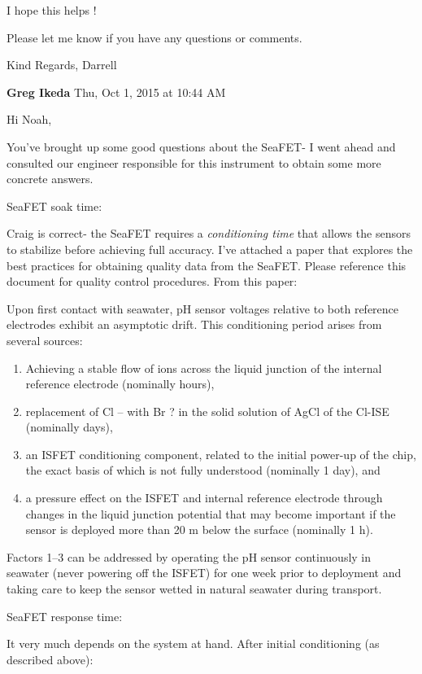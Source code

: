\documentclass[
]{book}
\begin{document}
I hope this helps !

Please let me know if you have any questions or comments.

Kind Regards,
Darrell

\textbf{Greg Ikeda} Thu, Oct 1, 2015 at 10:44 AM

Hi Noah,

You've brought up some good questions about the SeaFET- I went ahead and consulted our engineer responsible for this instrument to obtain some more concrete answers.

SeaFET soak time:

Craig is correct- the SeaFET requires a \emph{conditioning time} that allows the sensors to stabilize before achieving full accuracy. I've attached a paper that explores the best practices for obtaining quality data from the SeaFET. Please reference this document for quality control procedures. From this paper:

Upon first contact with seawater, pH sensor voltages relative to both reference electrodes exhibit an asymptotic
drift. This conditioning period arises from several sources:

\begin{enumerate}
\def\labelenumi{\arabic{enumi})}
\item
  Achieving a stable flow of ions across the liquid junction of the internal reference electrode (nominally hours),
\item
  replacement of Cl -- with Br ? in the solid solution of AgCl of the Cl-ISE (nominally days),
\item
  an ISFET conditioning component, related to the initial power-up of the chip, the exact basis of which is not fully understood (nominally 1 day), and
\item
  a pressure effect on the ISFET and internal reference electrode through changes in the liquid junction potential that may become important if the sensor is deployed more than 20 m below the surface (nominally 1 h).
\end{enumerate}

Factors 1--3 can be addressed by operating the pH sensor continuously in seawater (never powering off the ISFET) for one week prior to deployment and taking care to keep the sensor wetted in natural seawater during transport.

SeaFET response time:

It very much depends on the system at hand. After initial conditioning (as described above):
\end{document}
